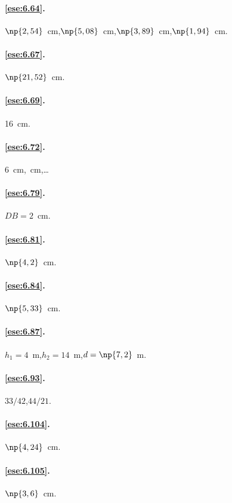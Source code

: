 \paragraph{\ref{ese:6.64}.}
$\np{2,54}$~cm,\quad $\np{5,08}$~cm,\quad $\np{3,89}$~cm,\quad $\np{1,94}$~cm.

\paragraph{\ref{ese:6.67}.}
$\np{21,52}$~cm.

\paragraph{\ref{ese:6.69}.}
16~cm.

\paragraph{\ref{ese:6.72}.}
6~cm,~cm,\quad \ldots{}

\paragraph{\ref{ese:6.79}.}
$DB=2$~cm.

\paragraph{\ref{ese:6.81}.}
$\np{4,2}$~cm.

\paragraph{\ref{ese:6.84}.}
$\np{5,33}$~cm.

\paragraph{\ref{ese:6.87}.}
$h_1=4$~m,\quad $h_2=14$~m,\quad $d=\np{7,2}$~m.

\paragraph{\ref{ese:6.93}.}
$33/42$,\quad $44/21$.

\paragraph{\ref{ese:6.104}.}
$\np{4,24}$~cm.

\paragraph{\ref{ese:6.105}.}
$\np{3,6}$~cm.

\endgroup
